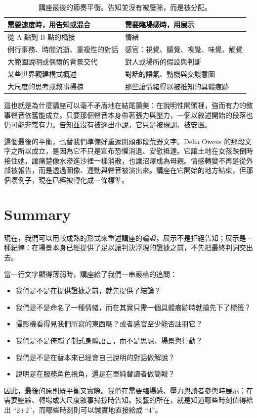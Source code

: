 \begin{table}[h]
\centering
\begin{tabular}{|p{}|p{}|}
\hline
\textbf{需要速度時，用告知或混合} & \textbf{需要臨場感時，用展示} \\
\hline
從 A 點到 B 點的橋接 & 情緒 \\
\hline
例行事務、時間流逝、重複性的對話 & 感官：視覺、聽覺、嗅覺、味覺、觸覺 \\
\hline
大範圍說明或偶爾的背景交代 & 對人或場所的假設與判斷 \\
\hline
某些世界觀建構式概述 & 對話的語氣、動機與交談意圖 \\
\hline
大尺度的思考或敘事掃掠 & 那些讓情緒得以被推知的具體痕跡 \\
\hline
\end{tabular}
\caption{講座最後的節奏平衡。告知並沒有被廢除，而是被分配。}
\end{table}

這也就是為什麼講座可以毫不矛盾地在結尾讚美：在說明性開頭裡，強而有力的敘事聲音依舊能成立。只要那個聲音本身帶著張力與壓力，一個以敘述開始的段落也仍可能非常有力。告知並沒有被逐出小說，它只是被規訓、被安置。

這個最後的平衡，也替我們準備好重返開頭那段荒野文字。Delia Owens 的那段文字之所以成立，是因為它不只是宣布恐懼消退、安慰抵達。它讓土地在女孩跌倒時接住她，讓痛楚像水滲進沙裡一樣消散，也讓沼澤成為母親。情感轉變不再是從外部被報告，而是透過圖像、運動與聲音被演出來。講座在它開始的地方結束，但那個壞例子，現在已經被轉化成一條標準。

\section{Summary}

現在，我們可以用較成熟的形式來重述講座的論證。展示不是拒絕告知；展示是一種紀律：在場景本身已經提供了足以讓判決浮現的證據之前，不先把最終判詞交出去。

當一行文字顯得薄弱時，講座給了我們一串嚴格的追問：
\begin{itemize}
\item 我們是不是在提供證據之前，就先提供了結論？
\item 我們是不是命名了一種情緒，而在其實只需一個具體痕跡時就搶先下了標籤？
\item 攝影機看得見我們所寫的東西嗎？或者感官至少能否註冊它？
\item 我們是不是倚賴了制式身體語言，而不是思想、場景與行動？
\item 我們是不是在替本來已經會自己說明的對話做解說？
\item 說明是在服務角色視角，還是在單純替讀者做簡報？
\end{itemize}

因此，最後的原則既平衡又實際。我們在需要臨場感、壓力與讀者參與時展示；在需要壓縮、轉場或大尺度敘事掃掠時告知。技藝的所在，就是知道哪些時刻值得給出 ``2+2''，而哪些時刻則可以誠實地直接給成 ``4''。